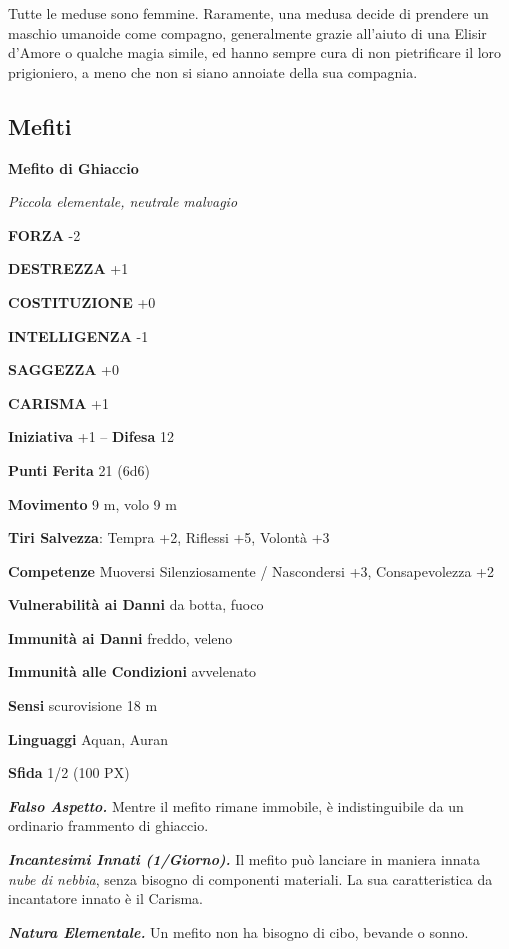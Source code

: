 \begin{multicols}{2}
Tutte le meduse sono femmine. Raramente, una medusa decide di prendere un maschio umanoide come compagno, generalmente grazie all'aiuto di una Elisir d'Amore o qualche magia simile, ed hanno sempre cura di non pietrificare il loro prigioniero, a meno che non si siano annoiate della sua compagnia.


\subsection{Mefiti}

\medskip{}\textbf{Mefito di Ghiaccio}

\textit{Piccola elementale, neutrale malvagio}

\textbf{FORZA} -2

\textbf{DESTREZZA} +1

\textbf{COSTITUZIONE} +0

\textbf{INTELLIGENZA} -1

\textbf{SAGGEZZA} +0

\textbf{CARISMA} +1

\textbf{Iniziativa} +1 -- \textbf{Difesa} 12

\textbf{Punti Ferita} 21 (6d6)

\textbf{Movimento} 9 m, volo 9 m

\textbf{Tiri Salvezza}: Tempra +2, Riflessi +5, Volontà +3

\textbf{Competenze} Muoversi Silenziosamente / Nascondersi +3, Consapevolezza +2

\textbf{Vulnerabilità ai Danni} da botta, fuoco

\textbf{Immunità ai Danni} freddo, veleno

\textbf{Immunità alle Condizioni} avvelenato

\textbf{Sensi} scurovisione 18 m

\textbf{Linguaggi} Aquan, Auran

\textbf{Sfida} 1/2 (100 PX)

\textit{\textbf{Falso Aspetto.}} Mentre il mefito rimane immobile, è indistinguibile da un ordinario frammento di ghiaccio.

\textit{\textbf{Incantesimi Innati (1/Giorno).}} Il mefito può lanciare in maniera innata \textit{nube di nebbia}, senza bisogno di componenti materiali. La sua caratteristica da incantatore innato è il Carisma.

\textit{\textbf{Natura Elementale.}} Un mefito non ha bisogno di cibo, bevande o sonno.


\end{multicols}
